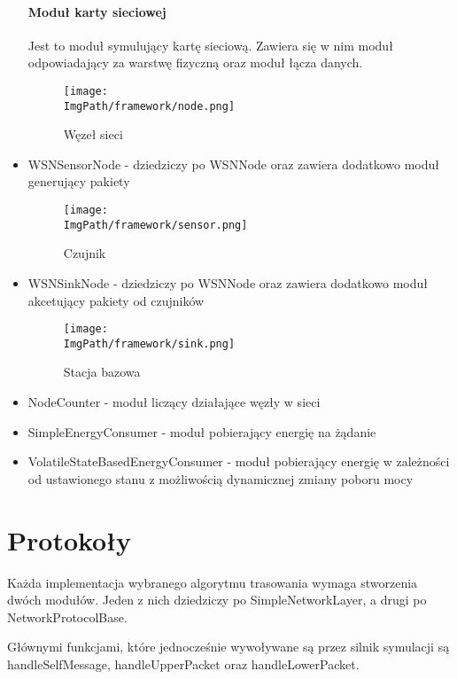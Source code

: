 \begin{itemize}
\paragraph{Moduł karty sieciowej} Jest to moduł symulujący kartę sieciową. Zawiera się w nim moduł odpowiadający za warstwę fizyczną oraz moduł łącza danych.
\begin{figure}[!htbp]
	\begin{center}
		\centering
		\texttt{[image: \\ImgPath/framework/node.png]} 
	\end{center}
	\caption{Węzeł sieci}
	\label{abstractNode}
\end{figure}
\FloatBarrier
	\item WSNSensorNode - dziedziczy po WSNNode oraz zawiera dodatkowo moduł generujący pakiety
	\begin{figure}[!htbp]
	\begin{center}
		\centering
		\texttt{[image: \\ImgPath/framework/sensor.png]} 
	\end{center}
	\caption{Czujnik}
	\label{openlayers}
\end{figure}
\FloatBarrier
	\item WSNSinkNode - dziedziczy po WSNNode oraz zawiera dodatkowo moduł akcetujący pakiety od czujników
	\begin{figure}[!htbp]
	\begin{center}
		\centering
		\texttt{[image: \\ImgPath/framework/sink.png]} 
	\end{center}
	\caption{Stacja bazowa}
	\label{abstractNode}
\end{figure}
\FloatBarrier
	\item NodeCounter - moduł liczący działające węzły w sieci
	\item SimpleEnergyConsumer - moduł pobierający energię na żądanie
	\item VolatileStateBasedEnergyConsumer - moduł pobierający energię w zależności od ustawionego stanu z możliwością dynamicznej zmiany poboru mocy
\end{itemize}
\section{Protokoły}
Każda implementacja wybranego algorytmu trasowania wymaga stworzenia dwóch modułów. Jeden z nich dziedziczy po SimpleNetworkLayer, a drugi po NetworkProtocolBase.

Głównymi funkcjami, które jednocześnie wywoływane są przez silnik symulacji są handleSelfMessage, handleUpperPacket oraz handleLowerPacket.

